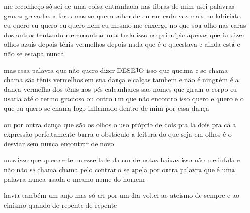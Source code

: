 \begin{poem}
\begin{stanza}
me reconheço \qquad só sei\verseline
de uma coisa entranhada\verseline
nas fibras de mim\verseline
usei palavras graves\verseline
gravadas a ferro\verseline
mas so quero saber de entrar\verseline
cada vez mais no labirinto\verseline
eu quero eu quero eu quero\verseline
nem eu mesmo\verseline
me enxergo no que sou\verseline
olho nas caras dos outros\verseline
tentando me encontrar\verseline
mas tudo isso no princípio apenas\verseline
queria dizer \qquad olhos azuis\verseline
depois \qquad tênis vermelhos\verseline
depois \qquad nada \quad que é o que\verseline estava
e ainda está\verseline
e não se escapa\verseline
nunca.
\end{stanza}
\begin{stanza}
mas essa palavra que não quero dizer\verseline
\qquad DESEJO\verseline
isso que queima e se chama\verseline
chama\verseline
são tênis vermelhos em sua dança\verseline
e calças tambem\verseline
e não é ninguém\verseline
\qquad é a dança vermelha\verseline
\qquad dos tênis nos pés\verseline
\qquad \qquad calcanhares sao nomes\verseline
\qquad \qquad que giram o corpo\verseline
\qquad \qquad \qquad eu usaria até o termo\verseline
\qquad \qquad \qquad gracioso\verseline
\qquad \qquad \qquad \qquad ou outro um\verseline
\qquad \qquad \qquad \qquad que não encontro\verseline
isso quero e quero e o que eu quero\verseline
se chama\verseline
fogo inflamado \qquad \qquad dentro de mim\verseline
por essa dança
\end{stanza}
\begin{stanza}
ou por outra dança\verseline
que são os olhos \qquad o uso próprio\verseline
de dois pra la dois pra cá \quad a expressão\verseline
perfeitamente burra\verseline
o obstáculo à leitura do que seja\verseline
em olhos \qquad é o desviar\verseline
sem nunca encontrar de novo
\end{stanza}
\begin{stanza}
mas isso que quero\verseline
e temo\verseline
esse bale da cor\verseline
de notas baixas\verseline
isso não me infala\verseline
e não \quad não se chama\verseline
chama \quad pelo contrario\verseline
se apela por outra palavra\verseline
que é uma palavra\verseline
nunca usada\verseline
o mesmo nome\verseline
do homem
\end{stanza}
\begin{stanza}
havia também um anjo\verseline
mas só cri por um dia\verseline
voltei ao ateísmo de sempre\verseline
e ao cinismo\verseline
quando de repente\verseline
de repente

\end{stanza}
\end{poem}
